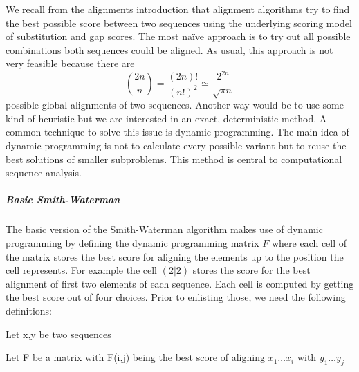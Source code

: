 We recall from the alignments introduction that alignment algorithms try to find the best possible score between two sequences using the underlying scoring model of substitution and gap scores.
The most na\"ive approach is to try out all possible combinations both sequences could be aligned. As usual, this approach is not very feasible because there are 
\begin{equation*}
	\binom{2n}{n} = \frac{(2n)!}{(n!)^2} \simeq \frac{2^{2n}}{\sqrt{\pi n}}
\end{equation*}
possible global alignments of two sequences\cite{durbin1998}. 
Another way would be to use some kind of heuristic but we are interested in an exact, deterministic method.
A common technique to solve this issue is dynamic programming\cite{bellman1957}. 
The main idea of dynamic programming is not to calculate every possible variant but to reuse the best solutions of smaller subproblems.  
This method is central to computational sequence analysis\cite{durbin1998}.

\subparagraph{Basic Smith-Waterman}
The basic version of the Smith-Waterman algorithm makes use of dynamic programming by defining the dynamic programming matrix $F$ where each cell of the matrix stores the best score for aligning the elements up to the position the cell represents.
For example the cell $(2|2)$ stores the score for the best alignment of first two elements of each sequence. 
Each cell is computed by getting the best score out of four choices. Prior to enlisting those, we need the following definitions: 

\begin{definition}
	\item Let x,y be two sequences
	\item Let F be a matrix with F(i,j) being the best score of aligning $x_1\dots x_i$ with $y_1\dots y_j$
\end{definition}

